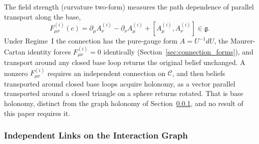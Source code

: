 \documentclass[11pt]{article}
\begin{document}
The field strength (curvature two-form) measures the path dependence of parallel transport along the base,
\begin{equation}
F^{(i)}_{\mu\nu}(c) = \partial_\mu A^{(i)}_\nu - \partial_\nu A^{(i)}_\mu + [A^{(i)}_\mu, A^{(i)}_\nu] \in \mathfrak{g}.
\label{eq:field_strength}
\end{equation}
Under Regime~I the connection has the pure-gauge form $A = U^{-1}dU$, the Maurer-Cartan identity forces $F^{(i)}_{\mu\nu} = 0$ identically (Section~\ref{sec:connection_forms}), and transport around any closed base loop returns the original belief unchanged. A nonzero $F^{(i)}_{\mu\nu}$ requires an independent connection on $\mathcal{C}$, and then beliefs transported around closed base loops acquire holonomy, as a vector parallel transported around a closed triangle on a sphere returns rotated. That is base holonomy, distinct from the graph holonomy of Section~\ref{sec:discrete_regime_ii}, and no result of this paper requires it.

\subsubsection{Independent Links on the Interaction Graph}
\label{sec:discrete_regime_ii}
\end{document}
